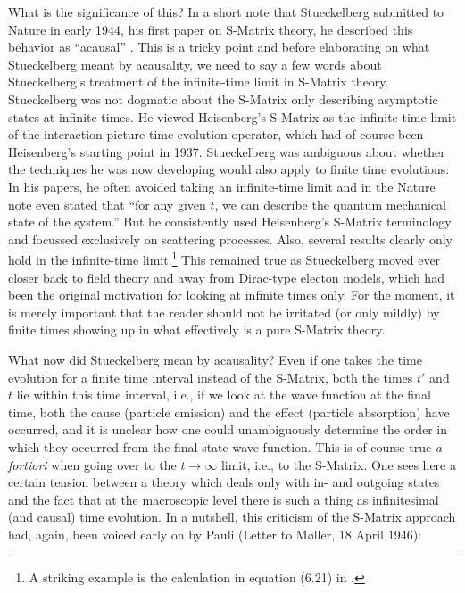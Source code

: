 \documentclass[12pt,a4paper]{article}
\begin{document}
What is the significance of this? In a short note that Stueckelberg submitted to Nature in early 1944, his first paper on S-Matrix theory, he described this behavior as ``acausal'' \citep{stueckelberg_1944_an-unambiguous}. This is a tricky point and before elaborating on what Stueckelberg meant by acausality, we need to say a few words about Stueckelberg's treatment of the infinite-time limit in S-Matrix theory. Stueckelberg was not dogmatic about the S-Matrix only describing asymptotic states at infinite times. He viewed Heisenberg's S-Matrix as the infinite-time limit of the interaction-picture time evolution operator, which had of course been Heisenberg's starting point in 1937. Stueckelberg was ambiguous about whether the techniques he was now developing would also apply to finite time evolutions: In his papers, he often avoided taking an infinite-time limit and in the Nature note even stated that ``for any given $t$, we can describe the quantum mechanical state of the system.'' But he consistently used Heisenberg's S-Matrix terminology and focussed exclusively on scattering processes. Also, several results clearly only hold in the infinite-time limit.\footnote{A striking example is the calculation in equation (6.21) in \citep{stueckelberg_1944_un-modele}.} This remained true as Stueckelberg moved ever closer back to field theory and away from Dirac-type electon models, which had been the original motivation for looking at infinite times only. For the moment, it is merely important that the reader should not be irritated (or only mildly) by finite times showing up in what effectively is a pure S-Matrix theory.

What now did Stueckelberg mean by acausality? Even if one takes the time evolution for a finite time interval instead of the S-Matrix, both the times $t'$ and $t$ lie within this time interval, i.e., if we look at the wave function at the final time, both the cause (particle emission) and the effect (particle absorption) have occurred, and it is unclear how one could unambiguously determine the order in which they occurred from the final state wave function. This is of course true \emph{a fortiori} when going over to the $t \rightarrow \infty$ limit, i.e., to the S-Matrix. One sees here a certain tension between a theory which deals only with in- and outgoing states and the fact that at the macroscopic level there is such a thing as infinitesimal (and causal) time evolution. In a nutshell, this criticism of the S-Matrix approach had, again, been voiced early on by Pauli (Letter to M\o ller, 18 April 1946):
\end{document}
